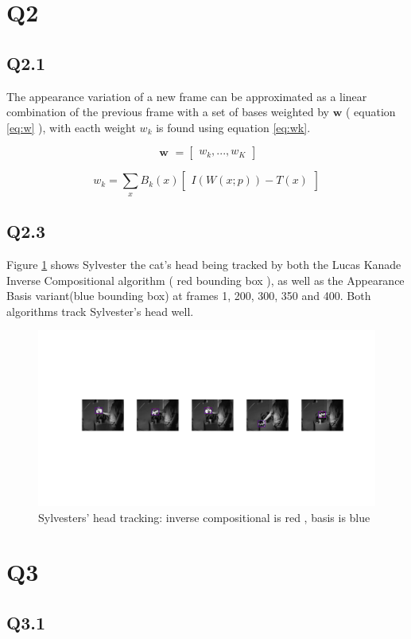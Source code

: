 \documentclass[12pt]{article}
\begin{document}
\section{Q2}
\subsection{Q2.1}
The appearance variation of a new frame can be approximated as a linear combination of the previous frame with a set of bases weighted by $\textbf{w}$ ( equation \ref{eq:w} ), with eacth weight $w_{k}$ is found using equation \ref{eq:wk}.

\begin{equation}
\label{eq:w}
\textbf { w } =
\begin{bmatrix}
w_{k}, ... , w_{K}
\end{bmatrix}
\end{equation}

\begin{equation}
\label{eq:wk}
w_{k}  = 
\sum_{x} B_{k} ( x )
\begin {bmatrix}
I ( W ( x ; p ) ) - T ( x )
\end {bmatrix}
\end{equation}

\subsection{Q2.3}
Figure \ref{fig:sylv} shows Sylvester the cat's head being tracked by both the Lucas Kanade Inverse Compositional algorithm ( red  bounding box ), as well as the Appearance Basis variant(blue bounding box) at frames 1, 200, 300, 350 and 400. Both algorithms track Sylvester's head well.
\begin{figure}[H]
\centering
\includegraphics[page=1,width=1.0\textwidth]{q23}
\caption{ Sylvesters' head tracking: inverse compositional is red , basis is blue } 
\label{fig:sylv}
\end{figure}   

\section{Q3}
\subsection{Q3.1}
\end{document}
